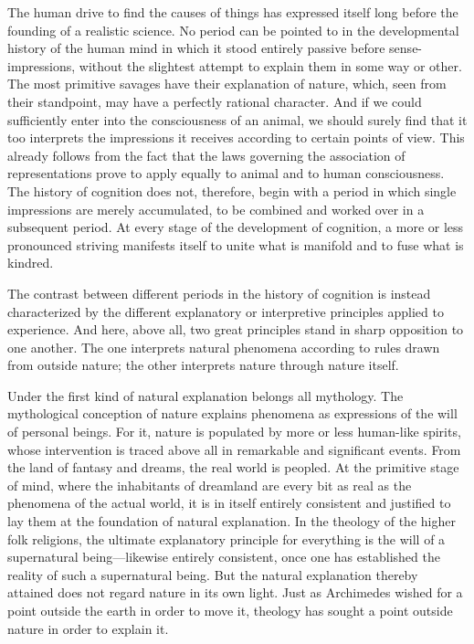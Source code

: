 \documentclass[12pt,a4paper]{article}
\begin{document}
The human drive to find the causes of things has expressed itself long
before the founding of a realistic science. No period can be pointed to
in the developmental history of the human mind in which it stood entirely
passive before sense-impressions, without the slightest attempt to explain
them in some way or other. The most primitive savages have their
explanation of nature, which, seen from their standpoint, may have a
perfectly rational character. And if we could sufficiently enter into the
consciousness of an animal, we should surely find that it too interprets
the impressions it receives according to certain points of view. This
already follows from the fact that the laws governing the association of
representations prove to apply equally to animal and to human
consciousness. The history of cognition does not, therefore, begin with
a period in which single impressions are merely accumulated, to be
combined and worked over in a subsequent period. At every stage of the
development of cognition, a more or less pronounced striving manifests
itself to unite what is manifold and to fuse what is kindred.

The contrast between different periods in the history of cognition is
instead characterized by the different explanatory or interpretive
principles applied to experience. And here, above all, two great
principles stand in sharp opposition to one another. The one interprets
natural phenomena according to rules drawn from outside nature; the other
interprets nature through nature itself.

Under the first kind of natural explanation belongs all mythology. The
mythological conception of nature explains phenomena as expressions of
the will of personal beings. For it, nature is populated by more or less
human-like spirits, whose intervention is traced above all in remarkable
and significant events. From the land of fantasy and dreams, the real
world is peopled. At the primitive stage of mind, where the inhabitants
of dreamland are every bit as real as the phenomena of the actual world,
it is in itself entirely consistent and justified to lay them at the
foundation of natural explanation. In the theology of the higher folk
religions, the ultimate explanatory principle for everything is the will
of a supernatural being---likewise entirely consistent, once one has
established the reality of such a supernatural being. But the natural
explanation thereby attained does not regard nature in its own light.
Just as Archimedes wished for a point outside the earth in order to move
it, theology has sought a point outside nature in order to explain it.
\end{document}
